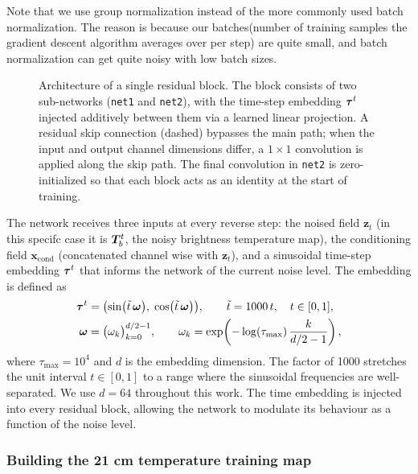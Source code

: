 Note that we use group normalization instead of the more commonly used batch normalization. The reason is because our batches(number of training samples the gradient descent algorithm averages over per step) are quite small, and batch normalization can get quite noisy with low batch sizes.

\begin{figure}[t]
    \centering
    
    \caption{Architecture of a single residual block. The block consists of two
    sub-networks (\texttt{net1} and \texttt{net2}), with the time-step embedding
    $\bm{\tau}^t$ injected additively between them via a learned linear projection.
    A residual skip connection (dashed) bypasses the main path; when the input and
    output channel dimensions differ, a $1\times1$ convolution is applied along the
    skip path. The final convolution in \texttt{net2} is zero-initialized so that
    each block acts as an identity at the start of training.}
    \label{fig:resnet_block}
\end{figure}



The network receives three inputs at every reverse step: the noised field
$\bm{z}_t$ (in this specifc case it is $\bm{T}_b^t$, the noisy brightness temperature map), the conditioning field $\bm{x}_{\mathrm{cond}}$ (concatenated
channel wise with $\bm{z}_t$), and a sinusoidal time-step embedding $\bm{\tau}^t$
that informs the network of the current noise level. The embedding is defined as
\begin{equation}
\begin{aligned}
    \bm{\tau}^t
    &= \bigl(\sin(\tilde{t}\,\boldsymbol{\omega}),\;
              \cos(\tilde{t}\,\boldsymbol{\omega})\bigr),
    \qquad \tilde{t}=1000\,t,\quad t\in[0,1], \\
    \boldsymbol{\omega}
    &= \bigl(\omega_k\bigr)_{k=0}^{d/2-1},
    \qquad
    \omega_k
    = \exp\!\left(
    -\log(\tau_{\max}) \, \frac{k}{d/2-1}
    \right),
\end{aligned}
\label{eq:time_embedding}
\end{equation}
where $\tau_{\max}=10^4$ and $d$ is the embedding dimension. The factor of 1000
stretches the unit interval $t \in [0,1]$ to a range where the sinusoidal
frequencies are well-separated. We use $d=64$ throughout this work. The time
embedding is injected into every residual block, allowing the network to
modulate its behaviour as a function of the noise level.



\subsubsection{Building the 21 cm temperature training map}


